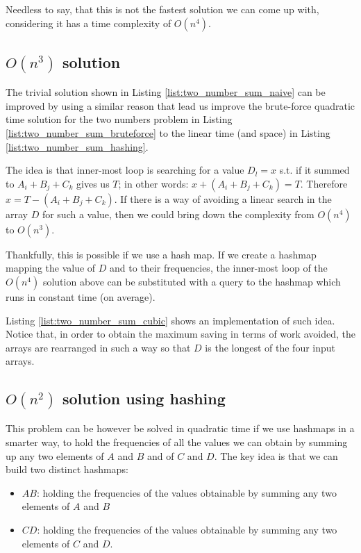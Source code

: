 

Needless to say, that this is not the fastest solution we can come up with, considering it has a time complexity of $O(n^4)$.

\subsection{$O(n^3)$ solution}
The trivial solution shown in Listing \ref{list:two_number_sum_naive} can be improved by using a similar reason that lead us improve the brute-force 
quadratic time solution for the two numbers problem in Listing \ref{list:two_number_sum_bruteforce} to the linear time (and space) in Listing \ref{list:two_number_sum_hashing}.

The idea is that inner-most loop is searching for a value $D_l = x$  s.t. if it summed to $A_i+B_j+C_k$ gives us $T$; in other words: $x+(A_i+B_j+C_k)=T$.
Therefore $x = T-(A_i+B_j+C_k)$. If there is a way of avoiding a linear search in the array $D$ for such a value, then we could bring down the complexity from $O(n^4)$ to $O(n^3)$.

Thankfully, this is possible if we use a hash map. If we create a hashmap mapping the value of $D$ and to their frequencies, the inner-most loop of the $O(n^4)$ solution above can be substituted with a query to the hashmap which runs in constant time (on average). 

Listing \ref{list:two_number_sum_cubic} shows an implementation of such idea. 
Notice that, in order to obtain the maximum saving in terms of work avoided, the arrays are rearranged in such a way so that $D$ is the longest of the four input arrays. 




\subsection{$O(n^2)$ solution using hashing}

This problem can be however be solved in quadratic time if we use hashmaps in a smarter way, to hold 
the frequencies of all the values we can obtain by summing up any two elements of $A$ and $B$ and of $C$ and $D$.
The key idea is that we can build two distinct hashmaps:
\begin{itemize}
	\item $AB$: holding the frequencies of the values obtainable by summing any two elements of $A$ and $B$
	\item $CD$: holding the frequencies of the values obtainable by summing any two elements of $C$ and $D$.
\end{itemize}

